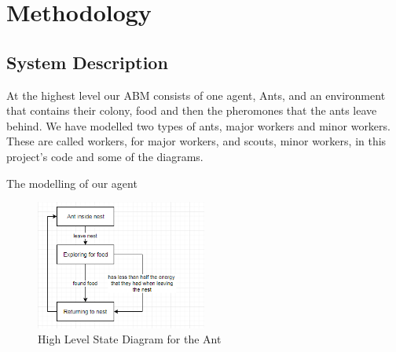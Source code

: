  \section{Methodology}
 
 
 
 \subsection{System Description}
 
At the highest level our ABM consists of one agent, Ants, and an environment that contains their colony, food and then the pheromones that the ants leave behind. We have modelled two types of ants, major workers and minor workers. These are called workers, for major workers, and scouts, minor workers, in this project's code and some of the diagrams.\par
The modelling of our agent 
 
 \begin{figure}[htb]
  \label{fig:ant-highlvl}
  \centering
  \includegraphics[width=0.5\textwidth]{images/top-level.png}
  \caption{High Level State Diagram for the Ant}
\end{figure}

